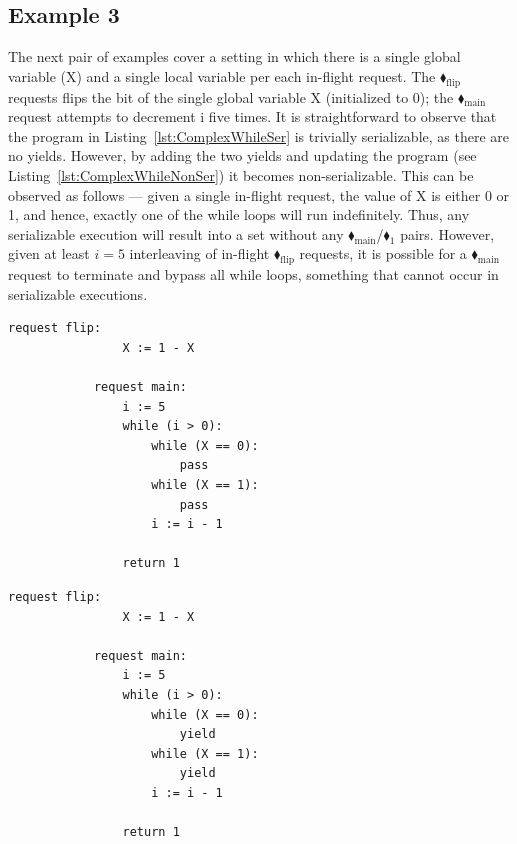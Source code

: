 \subsection{Example 3}

The next pair of examples cover a setting in which there is a single global variable (X) and a single local variable per each in-flight request. The {\color{ForestGreen}$\blacklozenge_\text{flip}$} requests flips the bit of the single global variable X (initialized to 0); the {\color{ForestGreen}$\blacklozenge_\text{main}$} request attempts to decrement i five times.
%
It is straightforward to observe that the program in Listing~\ref{lst:ComplexWhileSer} is trivially serializable, as there are no yields.
%
However, by adding the two yields and updating the program (see Listing~\ref{lst:ComplexWhileNonSer}) it becomes non-serializable. This can be observed as follows --- given a single in-flight request, the value of X is either 0 or 1, and hence, exactly one of the while loops will run indefinitely. Thus, any serializable execution will result into a set without any {\color{ForestGreen}$\blacklozenge_\text{main}$}/{\color{red}$\blacklozenge_1$} pairs.
%
However, given at least $i=5$ interleaving of in-flight {\color{ForestGreen}$\blacklozenge_\text{flip}$} requests, it is possible for a {\color{ForestGreen}$\blacklozenge_\text{main}$} request to terminate and bypass all while loops, something that cannot occur in serializable executions.


\noindent
\begin{minipage}[t]{0.45\textwidth}
	\begin{lstlisting}[caption={Serializable},
		label={lst:ComplexWhileSer}]
		    request flip: 
		        X := 1 - X 
		    
		    request main:
		        i := 5
		        while (i > 0):
		            while (X == 0):
		                pass
		            while (X == 1):
		                pass
		            i := i - 1
		        
		        return 1       
				\end{lstlisting}
\end{minipage}%
\hfill
\begin{minipage}[t]{0.45\textwidth}
	\begin{lstlisting}[caption={Not serializable},
		label={lst:ComplexWhileNonSer}]
		    request flip: 
		        X := 1 - X 
		
		    request main:
		        i := 5
		        while (i > 0):
		            while (X == 0):
		                yield
		            while (X == 1):
		                yield
		            i := i - 1
		
		        return 1        
					\end{lstlisting}
\end{minipage}
	
